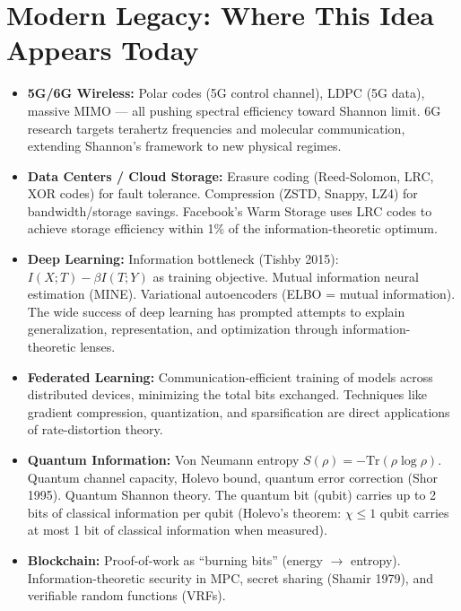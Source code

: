 \section{Modern Legacy: Where This Idea Appears Today}
\label{sec:information:legacy}

\begin{itemize}
\item \textbf{5G/6G Wireless:} Polar codes (5G control channel), LDPC (5G data), massive MIMO — all pushing spectral efficiency toward Shannon limit. 6G research targets terahertz frequencies and molecular communication, extending Shannon's framework to new physical regimes.

\item \textbf{Data Centers / Cloud Storage:} Erasure coding (Reed-Solomon, LRC, XOR codes) for fault tolerance. Compression (ZSTD, Snappy, LZ4) for bandwidth/storage savings. Facebook's Warm Storage uses LRC codes to achieve storage efficiency within 1\% of the information-theoretic optimum.

\item \textbf{Deep Learning:} Information bottleneck (Tishby 2015): $I(X;T) - \beta I(T;Y)$ as training objective. Mutual information neural estimation (MINE). Variational autoencoders (ELBO = mutual information). The wide success of deep learning has prompted attempts to explain generalization, representation, and optimization through information-theoretic lenses.

\item \textbf{Federated Learning:} Communication-efficient training of models across distributed devices, minimizing the total bits exchanged. Techniques like gradient compression, quantization, and sparsification are direct applications of rate-distortion theory.

\item \textbf{Quantum Information:} Von Neumann entropy $S(\rho) = -\mathrm{Tr}(\rho \log \rho)$. Quantum channel capacity, Holevo bound, quantum error correction (Shor 1995). Quantum Shannon theory. The quantum bit (qubit) carries up to 2 bits of classical information per qubit (Holevo's theorem: $\chi \le 1$ qubit carries at most 1 bit of classical information when measured).

\item \textbf{Blockchain:} Proof-of-work as ``burning bits'' (energy $\to$ entropy). Information-theoretic security in MPC, secret sharing (Shamir 1979), and verifiable random functions (VRFs).


\end{itemize}
